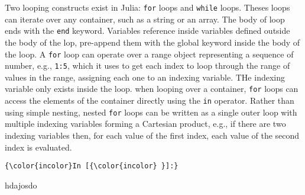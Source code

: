 \documentclass[11pt]{article}
\begin{document}
Two looping constructs exist in Julia: \texttt{for} loops and
\texttt{while} loops. Theses loops can iterate over any container, such
as a string or an array. The body of loop ends with the \texttt{end}
keyword. Variables reference inside variables defined outside the body
of the lop, pre-append them with the global keyword inside the body of
the loop. A \texttt{for} loop can operate over a range object
representing a sequence of number, e.g., \texttt{1:5}, which it uses to
get each index to loop through the range of values in the range,
assigning each one to an indexing variable. THe indexing variable only
exists inside the loop. when looping over a container, \texttt{for}
loops can access the elements of the container directly using the
\texttt{in} operator. Rather than using simple nesting, nested
\texttt{for} loops can be written as a single outer loop with multiple
indexing variables forming a Cartesian product, e.g., if there are two
indexing variables then, for each value of the first index, each value
of the second index is evaluated.

    \begin{Verbatim}[commandchars=\\\{\}]
{\color{incolor}In [{\color{incolor} }]:} 
\end{Verbatim}
hdajosdo

    
    
    
    
\end{document}
